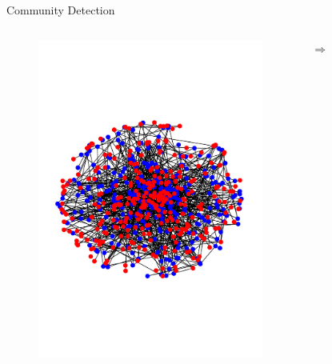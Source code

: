\documentclass{beamer}
\begin{document}
\begin{frame}{Community Detection}
\begin{columns}
\begin{figure}
			\includegraphics[width=\textwidth]{benno2t.pdf}
		\end{figure}
		$\Rightarrow$
		\begin{figure}

\end{figure}
\end{columns}
\end{frame}
\end{document}

